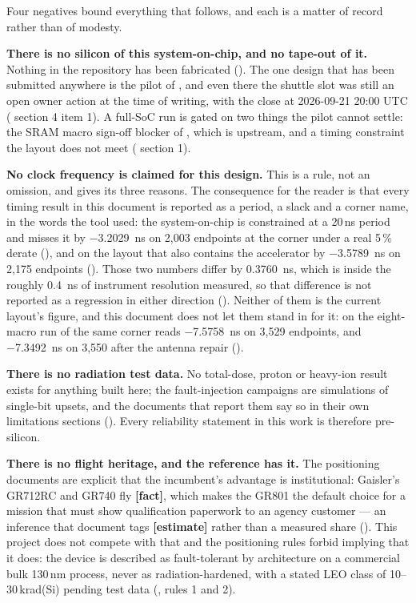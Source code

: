 Four negatives bound everything that follows, and each is a matter of
record rather than of modesty.

\textbf{There is no silicon of this system-on-chip, and no tape-out of
it.} Nothing in the repository has been fabricated
(). The one design that has been submitted
anywhere is the pilot of , and even there the
shuttle slot was still an open owner action at the time of writing, with
the close at 2026-09-21 20:00 UTC ( section 4 item 1).
A full-SoC run is gated on two things the pilot cannot settle: the SRAM
macro sign-off blocker of , which is upstream, and a
timing constraint the layout does not meet ( section 1).

\textbf{No clock frequency is claimed for this design.} This is a rule,
not an omission, and  gives its three reasons. The
consequence for the reader is that every timing result in this document
is reported as a period, a slack and a corner name, in the words the
tool used: the system-on-chip is constrained at a 20\,ns period and
misses it by \qty{-3.2029}{\nano\second} on 2{,}003 endpoints at the
 corner under a real 5\,\% derate
(), and on the layout that also contains the
accelerator by \qty{-3.5789}{\nano\second} on 2{,}175 endpoints
(). Those two numbers differ by
\qty{0.3760}{\nano\second}, which is inside the roughly
\qty{0.4}{\nano\second} of instrument resolution 
measured, so that difference is not reported as a regression in either
direction (). Neither of them is the current
layout's figure, and this document does not let them stand in for it:
on the eight-macro run of  the same corner reads
\qty{-7.5758}{\nano\second} on 3{,}529 endpoints, and
\qty{-7.3492}{\nano\second} on 3{,}550 after the antenna repair
().

\textbf{There is no radiation test data.} No total-dose, proton or
heavy-ion result exists for anything built here; the fault-injection
campaigns are simulations of single-bit upsets, and the documents that
report them say so in their own limitations sections
(). Every reliability statement in this
work is therefore pre-silicon.

\textbf{There is no flight heritage, and the reference has it.} The
positioning documents are explicit that the incumbent's advantage is
institutional: Gaisler's GR712RC and GR740 fly \textbf{[fact]}, which
makes the GR801 the default choice for a mission that must show
qualification paperwork to an agency customer --- an inference that
document tags \textbf{[estimate]} rather than a measured share
(). This project does not
compete with that and the positioning rules forbid implying that it
does: the device is described as fault-tolerant by architecture on a
commercial bulk 130\,nm process, never as radiation-hardened, with a
stated LEO class of 10--30\,krad(Si) pending test data
(, rules 1 and 2).

